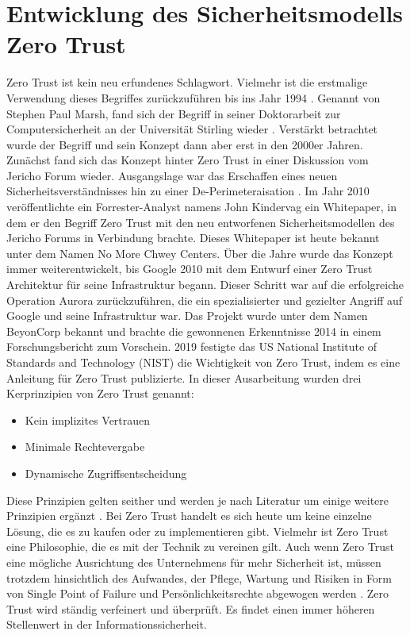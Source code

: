 \documentclass[lettersize,journal]{IEEEtran}
\begin{document}
\section{Entwicklung des Sicherheitsmodells Zero Trust}
Zero Trust ist kein neu erfundenes Schlagwort. Vielmehr ist die erstmalige Verwendung dieses Begriffes zurückzuführen bis ins Jahr 1994 \cite[8]{BundesamtfurSicherheitinderInformationstechnik.762023}. Genannt von Stephen Paul Marsh, fand sich der Begriff in seiner Doktorarbeit zur Computersicherheit an der Universität Stirling wieder \cite[8]{BundesamtfurSicherheitinderInformationstechnik.762023}. Verstärkt betrachtet wurde der Begriff und sein Konzept dann aber erst in den 2000er Jahren. Zunächst fand sich das Konzept hinter Zero Trust in einer Diskussion vom Jericho Forum wieder. Ausgangslage war das Erschaffen eines neuen Sicherheitsverständnisses hin zu einer De-Perimeteraisation \cite{fox2022zero}. Im Jahr 2010 veröffentlichte ein Forrester-Analyst namens John Kindervag ein Whitepaper, in dem er den Begriff Zero Trust mit den neu entworfenen Sicherheitsmodellen des Jericho Forums in Verbindung brachte. Dieses Whitepaper ist heute bekannt unter dem Namen No More Chwey Centers. Über die Jahre wurde das Konzept immer weiterentwickelt, bis Google 2010 mit dem Entwurf einer Zero Trust Architektur für seine Infrastruktur begann. Dieser Schritt war auf die erfolgreiche Operation Aurora zurückzuführen, die ein spezialisierter und gezielter Angriff auf Google und seine Infrastruktur war. Das Projekt wurde unter dem Namen BeyonCorp bekannt und brachte die gewonnenen Erkenntnisse 2014 in einem Forschungsbericht zum Vorschein. 2019 festigte das US National Institute of Standards and Technology (NIST) die Wichtigkeit von Zero Trust, indem es eine Anleitung für Zero Trust publizierte. In dieser Ausarbeitung wurden drei Kerprinzipien von Zero Trust genannt:
\begin{itemize}
	\item Kein implizites Vertrauen
	\item Minimale Rechtevergabe
	\item Dynamische Zugriffsentscheidung
\end{itemize}
Diese Prinzipien gelten seither und werden je nach Literatur um einige weitere Prinzipien ergänzt  \cite{BundesamtfurSicherheitinderInformationstechnik.762023}.
Bei Zero Trust handelt es sich heute um keine einzelne Lösung, die es zu kaufen oder zu implementieren gibt. Vielmehr ist Zero Trust eine Philosophie, die es mit der Technik zu vereinen gilt. Auch wenn Zero Trust eine mögliche Ausrichtung des Unternehmens für mehr Sicherheit ist, müssen trotzdem hinsichtlich des Aufwandes, der Pflege, Wartung und Risiken in Form von Single Point of Failure und Persönlichkeitsrechte abgewogen werden \cite{fox2022zero}.
Zero Trust wird ständig verfeinert und überprüft. Es findet einen immer höheren Stellenwert in der Informationssicherheit. 
\end{document}
